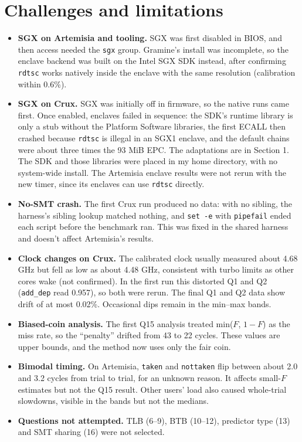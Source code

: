 \documentclass[10pt]{article}
\newcommand{\code}[1]{\texttt{#1}}
\begin{document}
\section{Challenges and limitations}
\begin{itemize}
\item \textbf{SGX on Artemisia and tooling.} SGX was first disabled in BIOS, and then access needed the \code{sgx} group. Gramine's install was incomplete, so
the enclave backend was built on the Intel SGX SDK instead, after confirming \code{rdtsc} works natively inside the enclave with the same resolution (calibration within 0.6\%).
\item \textbf{SGX on Crux.} SGX was initially off in firmware, so the native runs came first. Once enabled, enclaves failed in sequence: the SDK's runtime library is only a stub without the Platform Software libraries, the first ECALL then crashed because \code{rdtsc} is illegal in an SGX1 enclave, and the default chains were about three times the 93 MiB EPC. The adaptations are in Section 1. The SDK and those libraries were placed in my home directory, with no system-wide install. The Artemisia enclave results were not rerun with the new timer, since its enclaves can use \code{rdtsc} directly.
\item \textbf{No-SMT crash.} The first Crux run produced no data: with no sibling, the harness's sibling lookup matched nothing, and \code{set -e} with \code{pipefail} ended each script before the benchmark ran. This was fixed in the shared harness and doesn't affect Artemisia's results.
\item \textbf{Clock changes on Crux.} The calibrated clock usually measured about 4.68 GHz but fell as low as about 4.48 GHz, consistent with turbo limits as other cores wake (not confirmed). In the first run this distorted Q1 and Q2 (\code{add\_dep} read 0.957), so both were rerun. The final Q1 and Q2 data show drift of at most 0.02\%. Occasional dips remain in the min--max bands.
\item \textbf{Biased-coin analysis.} The first Q15 analysis treated min($F$, $1-F$) as the miss rate, so the ``penalty'' drifted from 43 to 22 cycles. These values are upper bounds, and the method now uses only the fair coin.
\item \textbf{Bimodal timing.} On Artemisia, \code{taken} and \code{nottaken} flip between about 2.0 and 3.2 cycles from trial to trial, for an unknown reason. It affects small-$F$ estimates but not the Q15 result. Other users' load also caused whole-trial slowdowns, visible in the bands but not the medians.
\item \textbf{Questions not attempted.} TLB (6--9), BTB (10--12), predictor type (13) and SMT sharing (16) were not selected.
\end{itemize}
\end{document}
